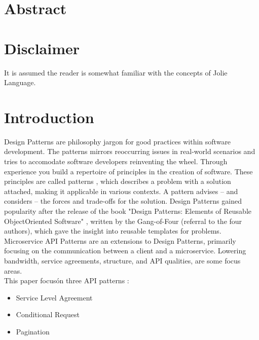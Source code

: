 \documentclass[12pt]{article}
\begin{document}

\tableofcontents
\newpage


\section{Abstract}

\section{Disclaimer}
It is assumed the reader is somewhat familiar with the concepts of Jolie Language. 

\newpage

\section{Introduction}
Design Patterns are philosophy jargon for good practices within software development. The patterns mirrors reoccurring issues in real-world scenarios and tries to accomodate software developers reinventing the wheel. Through experience you build a repertoire of principles in the creation of software. These principles are called patterns \cite{Applying_Patterns}, which describes a problem with a solution attached, making it applicable in various contexts. A pattern advises -- and considers -- the forces and trade-offs for the solution. Design Patterns gained popularity after the release of the book "Design Patterns: Elements of Reusable Object\-Oriented Software" \cite{DesignPGoF}, written by the Gang-of-Four (referral to the four authors), which gave the insight into reusable templates for problems. Microservice API Patterns are an extensions to Design Patterns, primarily focusing on the communication between a client and a microservice. Lowering bandwidth, service agreements, structure, and API qualities, are some focus areas. \\
This paper focus\' on three API patterns \cite{MAPIPweb}: 

\begin{itemize}
    \item Service Level Agreement
    \item Conditional Request
    \item Pagination
\end{itemize}
\end{document}
